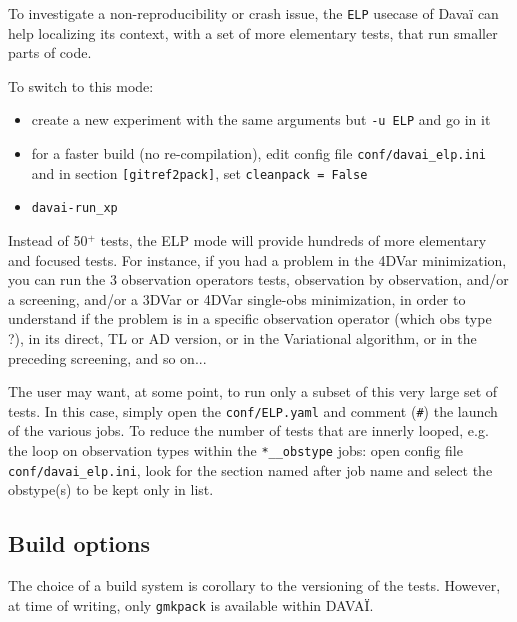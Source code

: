 \documentclass[a4paper,10pt,twoside]{article}
\begin{document}
To investigate a non-reproducibility or crash issue, the \texttt{ELP} usecase of Davaï can help localizing its context, with a set of more elementary tests, that run smaller parts of code.

\noindent To switch to this mode:
\begin{itemize}
 \item create a new experiment with the same arguments but \texttt{-u ELP} and go in it
 \item for a faster build (no re-compilation), edit config file \texttt{conf/davai\_elp.ini} and in section \texttt{[gitref2pack]}, set \texttt{cleanpack = False}
 \item \texttt{davai-run\_xp}
\end{itemize}

\noindent Instead of 50$^+$ tests, the ELP mode will provide hundreds of more elementary and focused tests. For instance, if you had a problem in the 4DVar minimization, you can run the 3 observation operators tests, observation by observation, and/or a screening, and/or a 3DVar or 4DVar single-obs minimization, in order to understand if the problem is in a specific observation operator (which obs type ?), in its direct, TL or AD version, or in the Variational algorithm, or in the preceding screening, and so on...

The user may want, at some point, to run only a subset of this very large set of tests. In this case, simply open the \texttt{conf/ELP.yaml} and comment (\texttt{\#}) the launch of the various jobs.
To reduce the number of tests that are innerly looped, e.g. the loop on observation types within the \texttt{*\_\_obstype} jobs: open config file \texttt{conf/davai\_elp.ini}, look for the section named after job name and select the obstype(s) to be kept only in list.


\subsection{Build options}
The choice of a build system is corollary to the versioning of the tests. However, at time of writing, only \texttt{gmkpack} is available within DAVAÏ.
\end{document}
